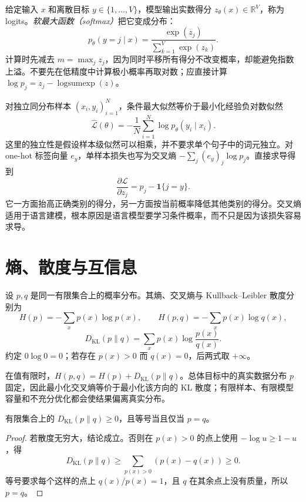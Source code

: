 给定输入 $x$ 和离散目标 $y\in\{1,\ldots,V\}$，模型输出实数得分 $z_\theta(x)\in\mathbb R^V$，称为 logits。\emph{软最大函数（softmax）}把它变成分布：
\[
p_\theta(y=j\mid x)=\frac{\exp(z_j)}{\sum_{k=1}^V\exp(z_k)}.
\]
计算时先减去 $m=\max_jz_j$，因为同时平移所有得分不改变概率，却能避免指数上溢。不要先在低精度中计算极小概率再取对数；应直接计算 $\log p_j=z_j-\operatorname{logsumexp}(z)$。

对独立同分布样本 $(x_i,y_i)_{i=1}^N$，条件最大似然等价于最小化经验负对数似然
\begin{equation}
\widehat{\mathcal L}(\theta)=-\frac1N\sum_{i=1}^N\log p_\theta(y_i\mid x_i).
\label{eq:nll}
\end{equation}
这里的独立性是假设样本级似然可以相乘，并不要求单个句子中的词元独立。对 one-hot 标签向量 $e_y$，单样本损失也写为交叉熵 $-\sum_j(e_y)_j\log p_j$。直接求导得到
\begin{equation}
\frac{\partial\mathcal L}{\partial z_j}=p_j-\mathbf1\{j=y\}.
\label{eq:ce-gradient}
\end{equation}
它一方面抬高正确类别的得分，另一方面按当前概率降低其他类别的得分。交叉熵适用于语言建模，根本原因是语言模型要学习条件概率，而不只是因为该损失容易求导。

\section{熵、散度与互信息}

\begin{definition}
设 $p,q$ 是同一有限集合上的概率分布。其熵、交叉熵与 Kullback--Leibler 散度分别为
\[
H(p)=-\sum_xp(x)\log p(x),\qquad
H(p,q)=-\sum_xp(x)\log q(x),
\]
\[
D_{\mathrm{KL}}(p\|q)=\sum_xp(x)\log\frac{p(x)}{q(x)}.
\]
约定 $0\log0=0$；若存在 $p(x)>0$ 而 $q(x)=0$，后两式取 $+\infty$。
\end{definition}

在值有限时，$H(p,q)=H(p)+D_{\mathrm{KL}}(p\|q)$。总体目标中的真实数据分布 $p$ 固定，因此最小化交叉熵等价于最小化该方向的 KL 散度；有限样本、有限模型容量和不充分优化都会使结果偏离真实分布。

\begin{proposition}
\label{prop:kl-nonnegative}
有限集合上的 $D_{\mathrm{KL}}(p\|q)\ge0$，且等号当且仅当 $p=q$。
\end{proposition}
\begin{proof}
若散度无穷大，结论成立。否则在 $p(x)>0$ 的点上使用 $-\log u\ge1-u$，得
\[
D_{\mathrm{KL}}(p\|q)\ge\sum_{p(x)>0}(p(x)-q(x))\ge0.
\]
等号要求每个这样的点上 $q(x)/p(x)=1$，且 $q$ 在其余点上没有质量，所以 $p=q$。
\end{proof}

